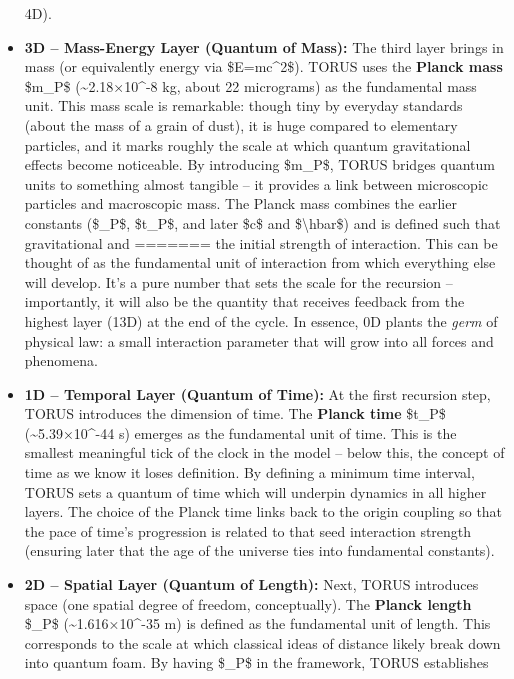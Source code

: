 \documentclass[]{article}
\begin{document}
\begin{itemize}
  4D).
\item
  \textbf{3D -- Mass-Energy Layer (Quantum of Mass):} The third layer
  brings in mass (or equivalently energy via \$E=mc\^{}2\$). TORUS uses
  the \textbf{Planck mass} \$m\_P\$ (\textasciitilde2.18×10\^{}-8 kg,
  about 22 micrograms) as the fundamental mass unit\hspace{0pt}. This
  mass scale is remarkable: though tiny by everyday standards (about the
  mass of a grain of dust), it is huge compared to elementary particles,
  and it marks roughly the scale at which quantum gravitational effects
  become noticeable. By introducing \$m\_P\$, TORUS bridges quantum
  units to something almost tangible -- it provides a link between
  microscopic particles and macroscopic mass. The Planck mass combines
  the earlier constants (\$\ell\_P\$, \$t\_P\$, and later \$c\$ and
  \$\textbackslash hbar\$) and is defined such that gravitational and
=======
  the initial strength of interaction​. This can be thought of as the
  fundamental unit of interaction from which everything else will
  develop. It's a pure number that sets the scale for the recursion --
  importantly, it will also be the quantity that receives feedback from
  the highest layer (13D) at the end of the cycle. In essence, 0D plants
  the \emph{germ} of physical law: a small interaction parameter that
  will grow into all forces and phenomena.
\item
  \textbf{1D -- Temporal Layer (Quantum of Time):} At the first
  recursion step, TORUS introduces the dimension of time. The
  \textbf{Planck time} \$t\_P\$ (\textasciitilde{}5.39×10\^{}-44 s)
  emerges as the fundamental unit of time​. This is the smallest
  meaningful tick of the clock in the model -- below this, the concept
  of time as we know it loses definition. By defining a minimum time
  interval, TORUS sets a quantum of time which will underpin dynamics in
  all higher layers. The choice of the Planck time links back to the
  origin coupling so that the pace of time's progression is related to
  that seed interaction strength (ensuring later that the age of the
  universe ties into fundamental constants).
\item
  \textbf{2D -- Spatial Layer (Quantum of Length):} Next, TORUS
  introduces space (one spatial degree of freedom, conceptually). The
  \textbf{Planck length} \$\ell\_P\$ (\textasciitilde{}1.616×10\^{}-35 m)
  is defined as the fundamental unit of length​. This corresponds to the
  scale at which classical ideas of distance likely break down into
  quantum foam. By having \$\ell\_P\$ in the framework, TORUS establishes

\end{itemize}
\end{document}

